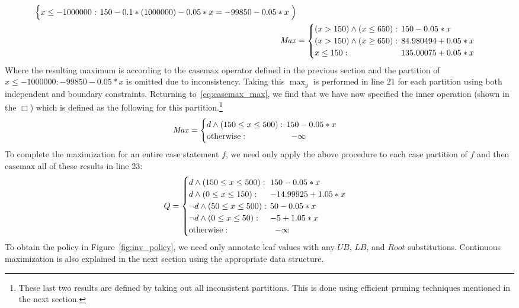 \documentclass[twoside,11pt]{article}
\newcommand{\casemax}{\mathrm{casemax}}
\newcommand{\UB}{\mathit{UB}}
\newcommand{\LB}{\mathit{LB}}
\newcommand{\Root}{\mathit{Root}}
\newcommand{\Max}{\mathit{Max}}
\newcommand{\sqm}{\hspace{-2mm}}
\begin{document}
\begin{enumerate}
{\begin{align*}
\begin{cases}
x \leq -1000000: & \sqm 150 - 0.1 * (1000000) - 0.05 * x =  -99850 -0.05 * x\\ 
\end{cases} \Big) 
\\
\Max & = 
\begin{cases}
(x > 150) \land (x \leq 650):    & \sqm 150 - 0.05 * x \\ 
(x > 150) \land (x \geq 650):    & \sqm 84.980494 + 0.05 * x \\ 
x \leq 150: & \sqm 135.00075 + 0.05 * x\\ 
\end{cases}
\end{align*}}
Where the resulting maximum is according to the $\casemax$ operator defined in the previous section and the partition of $x \leq -1000000:  -99850 -0.05 * x$ is omitted due to inconsistency. Taking this $\max_y$ is performed in line 21 for each partition using both independent and boundary constraints. Returning to~\eqref{eq:casemax_max}, we find that we have now specified the inner operation (shown in the $\Box$) which is defined as the following for this partition.\footnote{ These last two results are defined by taking out all inconsistent partitions. This is done using efficient pruning techniques mentioned in the next section.}
\begin{align*}
\Max & = 
\begin{cases}
d \land (150 \leq x \leq 500):    & \sqm 150 - 0.05 * x \\ 
\text{\normalsize otherwise} : & -\infty\\ 
\end{cases}
\end{align*}
To complete the maximization for an entire case statement $f$, we need only apply the above procedure to each case partition of $f$ and then $\casemax$ all of these results in line 23: 
\begin{align*}
Q & = 
\begin{cases}
d \land (150 \leq x \leq 500):    & \sqm 150 - 0.05 * x \\ 
d \land (0 \leq x \leq 150):    & \sqm -14.99925 + 1.05 * x \\ 
\neg d \land (50 \leq x \leq 500):    & \sqm 50 - 0.05 * x \\ 
\neg d \land (0 \leq x \leq 50):    & \sqm -5 + 1.05 * x \\ 
\text{\normalsize otherwise} : & -\infty\\ 
\end{cases}
\end{align*}
To obtain the policy in Figure~\ref{fig:inv_policy}, 
we need only annotate leaf values with any 
$\UB$, $\LB$, and $\Root$ substitutions.
Continuous maximization is also	 explained in the next section using the appropriate data structure. 


\end{enumerate}
\end{document}
